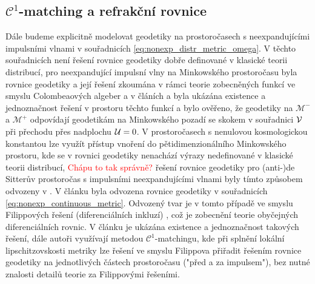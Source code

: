 \subsection{$\mathcal{C}^1$-matching a refrakční rovnice}
Dále budeme explicitně modelovat geodetiky na prostoročasech s neexpandujícími impulsními vlnami v souřadnicích
\eqref{eq:nonexp_distr_metric_omega}. V těchto souřadnicích není řešení rovnice geodetiky dobře definované v
klasické teorii distribucí, pro neexpandující impulsní vlny na Minkowského prostoročasu byla rovnice geodetiky
a její řešení zkoumána v rámci teorie zobecněných funkcí ve smyslu Colombeaových algeber a v článích \cite{Steinbauer_1998} a \cite{Kunzinger_1999}
byla ukázána existence a jednoznačnost řešení v prostoru těchto funkcí a bylo ověřeno, že geodetiky na $\mathcal{M}^-$ a $\mathcal{M}^+$ odpovídají
geodetikám na Minkowského pozadí se skokem v souřadnici $\mathcal{V}$ při přechodu přes nadplochu $\mathcal{U}=0$. V prostoročasech s
nenulovou kosmologickou konstantou lze využít přístup vnoření do pětidimenzionálního Minkowského prostoru, kde se v rovnici
geodetiky nenachází výrazy nedefinované v klasické teorii distribucí, \textcolor{red}{Chápu to tak správně?} řešení rovnice geodetiky
pro (anti-)de Sitterův prostoročas s impulsními neexpandujícími vlnami byly tímto způsobem odvozeny v \cite{Podolsk__2001}.
V článku \cite{Podolsky:2014ysa} byla odvozena rovnice geodetiky v souřadnicích \eqref{eq:nonexp_continuous_metric}.
Odvozený tvar je v tomto případě ve smyslu Filippových řešení (diferenciálních inkluzí) \cite{filippov1988differential}, což je zobecnění teorie obyčejných diferenciálních rovnic.
V článku je ukázána existence a jednoznačnost takových řešení, dále autoři využívají metodou $\mathcal{C}^1$-matchingu,
kde při splnění lokální lipschitzovskosti metriky lze řešení ve smyslu Filippova přiřadit řešením rovnice geodetiky na jednotlivých částech prostoročasu
("před a za impulsem"), bez nutné znalosti detailů teorie za Filippovými řešeními.

